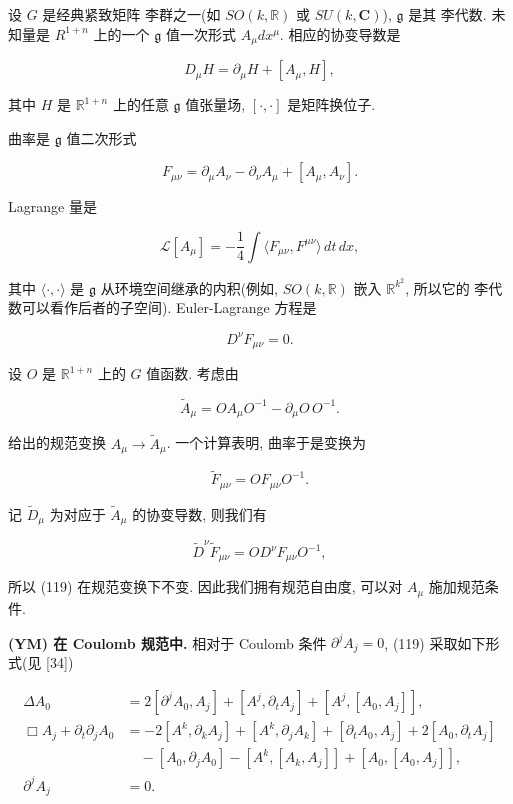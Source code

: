 
设 $G$ 是经典紧致矩阵 李群之一(如 $SO(k, \mathbb{R})$ 或 $SU(k, \mathbf{C})$), $\mathfrak{g}$ 是其 李代数. 未知量是 $R^{1+n}$ 上的一个 $\mathfrak{g}$ 值一次形式 $A_{\mu}dx^{\mu}$. 相应的协变导数是

\[
D_{\mu}H = \partial_{\mu}H + [A_{\mu},  H], 
\]

其中 $H$ 是 $\mathbb{R}^{1+n}$ 上的任意 $\mathfrak{g}$ 值张量场, $[\cdot, \cdot]$ 是矩阵换位子. 

曲率是 $\mathfrak{g}$ 值二次形式

\[
F_{\mu\nu} = \partial_{\mu}A_{\nu} - \partial_{\nu}A_{\mu} + [A_{\mu},  A_{\nu}].
\]

Lagrange 量是

\[
\mathcal{L}[A_{\mu}] = -\frac{1}{4}\int\langle F_{\mu\nu},  F^{\mu\nu}\rangle\, dt\, dx, 
\]

其中 $\langle\cdot, \cdot\rangle$ 是 $\mathfrak{g}$ 从环境空间继承的内积(例如, $SO(k, \mathbb{R})$ 嵌入 $\mathbb{R}^{k^2}$, 所以它的 李代数可以看作后者的子空间). Euler-Lagrange 方程是

\[
D^{\nu}F_{\mu\nu} = 0.\tag{YM}
\]

设 $O$ 是 $\mathbb{R}^{1+n}$ 上的 $G$ 值函数. 考虑由

\[
\widetilde{A}_{\mu} = OA_{\mu}O^{-1} - \partial_{\mu}O\, O^{-1}.
\]

给出的规范变换 $A_{\mu} \to \widetilde{A}_{\mu}$. 一个计算表明, 曲率于是变换为

\[
\widetilde{F}_{\mu\nu} = OF_{\mu\nu}O^{-1}.
\]

记 $\widetilde{D}_{\mu}$ 为对应于 $\widetilde{A}_{\mu}$ 的协变导数, 则我们有

\[
\widetilde{D}^{\nu}\widetilde{F}_{\mu\nu} = OD^{\nu}F_{\mu\nu}O^{-1}, 
\]

所以 (119) 在规范变换下不变. 因此我们拥有规范自由度, 可以对 $A_{\mu}$ 施加规范条件. 

\noindent\textbf{(YM) 在 Coulomb 规范中. }相对于 Coulomb 条件 $\partial^j A_j = 0$, (119) 采取如下形式(见 {[}34{]})

\begin{subequations}\label{eq:cG-119}
\begin{align}
\Delta A_{0} &= 2[\partial^{j}A_{0},  A_{j}] + [A^{j},  \partial_{t}A_{j}] + [A^{j},  [A_{0},  A_{j}]],  \label{eq:cG-119a} \\
\Box A_{j} + \partial_{t}\partial_{j}A_{0} &= -2[A^{k},  \partial_{k}A_{j}] + [A^{k},  \partial_{j}A_{k}] + [\partial_{t}A_{0},  A_{j}] + 2[A_{0},  \partial_{t}A_{j}] \nonumber \\
&\quad - [A_{0},  \partial_{j}A_{0}] - [A^{k},  [A_{k},  A_{j}]] + [A_{0},  [A_{0},  A_{j}]],  \label{eq:cG-119b} \\
\partial^{j}A_{j} &= 0. \label{eq:cG-119c}
\end{align}
\end{subequations}

